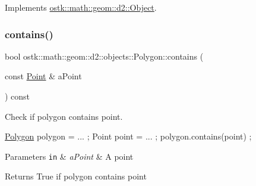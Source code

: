 Implements \hyperlink{classostk_1_1math_1_1geom_1_1d2_1_1_object_a98dedc6792aef35308966ca768eb3e14}{ostk\+::math\+::geom\+::d2\+::\+Object}.

\mbox{\label{classostk_1_1math_1_1geom_1_1d2_1_1objects_1_1_polygon_aa9f49a046d832821a8b26064b3cf2158}} 
\subsubsection{\texorpdfstring{contains()}{contains()}\hspace{0.1cm}{\footnotesize\ttfamily [1/3]}}
{\footnotesize\ttfamily bool ostk\+::math\+::geom\+::d2\+::objects\+::\+Polygon\+::contains (\begin{DoxyParamCaption}\item[{const \hyperlink{classostk_1_1math_1_1geom_1_1d2_1_1objects_1_1_point}{Point} \&}]{a\+Point }\end{DoxyParamCaption}) const}



Check if polygon contains point. 


\begin{DoxyCode}
\hyperlink{classostk_1_1math_1_1geom_1_1d2_1_1objects_1_1_polygon_adaf9ef564754ab10ed3dd0d5fa0d90ea}{Polygon} polygon = ... ;
Point point = ... ;
polygon.contains(point) ;
\end{DoxyCode}



\begin{DoxyParams}[1]{Parameters}
\mbox{\tt in}  & {\em a\+Point} & A point \\
\hline
\end{DoxyParams}
\begin{DoxyReturn}{Returns}
True if polygon contains point 
\end{DoxyReturn}
\mbox{\label{classostk_1_1math_1_1geom_1_1d2_1_1objects_1_1_polygon_a6a95f14d1bcbc3d0231ed09f31d17045}} 

